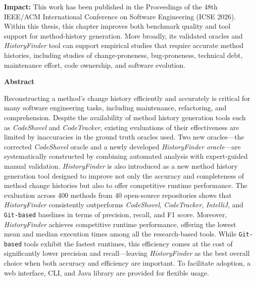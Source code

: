 \textbf{Impact:} This work has been published in the Proceedings of the 48th IEEE/ACM International Conference on Software Engineering (ICSE 2026). Within this thesis, this chapter improves both benchmark quality and tool support for method-history generation. More broadly, its validated oracles and \textit{HistoryFinder} tool can support empirical studies that require accurate method histories, including studies of change-proneness, bug-proneness, technical debt, maintenance effort, code ownership, and software evolution.


\clearpage

\begin{center}
{\Large\bfseries Abstract}
\end{center}
Reconstructing a method’s change history efficiently and accurately is critical for many software engineering tasks, including maintenance, refactoring, and comprehension. Despite the availability of method history generation tools such as \textit{CodeShovel} and \textit{CodeTracker}, existing evaluations of their effectiveness are limited by inaccuracies in the ground truth oracles used. Two new oracles—the corrected \textit{CodeShovel} oracle and a newly developed \emph{HistoryFinder oracle}—are systematically constructed by combining automated analysis with expert-guided manual validation. \textit{HistoryFinder} is also introduced as a new method history generation tool designed to improve not only the accuracy and completeness of method change histories but also to offer competitive runtime performance. The evaluation across 400 methods from 40 open-source repositories shows that \textit{HistoryFinder} consistently outperforms \textit{CodeShovel}, \textit{CodeTracker}, \textit{IntelliJ}, and \texttt{Git-based} baselines in terms of precision, recall, and F1 score. Moreover, \textit{HistoryFinder} achieves competitive runtime performance, offering the lowest mean and median execution times among all the research-based tools. While \texttt{Git-based} tools exhibit the fastest runtimes, this efficiency comes at the cost of significantly lower precision and recall—leaving \textit{HistoryFinder} as the best overall choice when both accuracy and efficiency are important. To facilitate adoption, a web interface, CLI, and Java library are provided for flexible usage.

\clearpage








